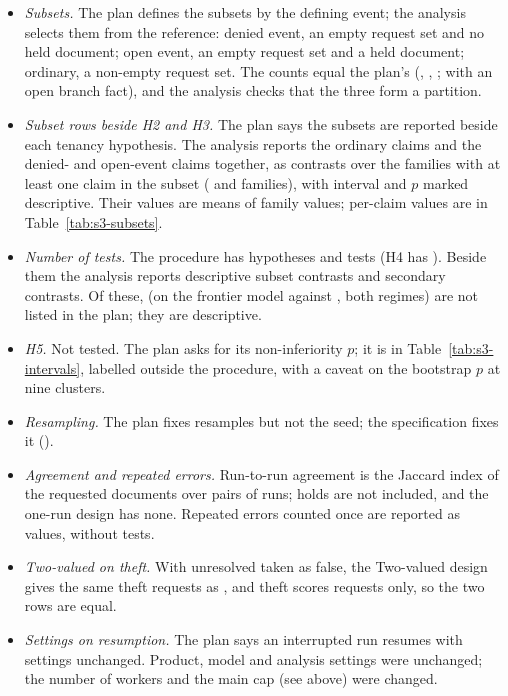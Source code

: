 \begin{itemize}[leftmargin=1.2em,itemsep=1pt]
\item \emph{Subsets.} The plan defines the subsets by the defining event; the analysis selects them from the reference: denied event, an empty request set and no held document; open event, an empty request set and a held document; ordinary, a non-empty request set. The counts equal the plan's (\sthreeClaimsDenied, \sthreeClaimsOpenEvent, \sthreeClaimsOrdinary; \sthreeClaimsOpenBranch{} with an open branch fact), and the analysis checks that the three form a partition.
\item \emph{Subset rows beside H2 and H3.} The plan says the subsets are reported beside each tenancy hypothesis. The analysis reports the ordinary claims and the denied- and open-event claims together, as contrasts over the families with at least one claim in the subset (\sthreeHTwoOrdinaryClusters{} and \sthreeHTwoDeniedOpenClusters{} families), with interval and $p$ marked descriptive. Their values are means of family values; per-claim values are in Table~\ref{tab:s3-subsets}.
\item \emph{Number of tests.} The procedure has \sthreeHypotheses{} hypotheses and \sthreePrimaryTests{} tests (H4 has \sthreeHFourTests). Beside them the analysis reports \sthreeBesideContrasts{} descriptive subset contrasts and \sthreeSecondaryContrasts{} secondary contrasts. Of these, \sthreeSecondaryVsCasePath{} (\casepath on the frontier model against \casepath, both regimes) are not listed in the plan; they are descriptive.
\item \emph{H5.} Not tested. The plan asks for its non-inferiority $p$; it is in Table~\ref{tab:s3-intervals}, labelled outside the procedure, with a caveat on the bootstrap $p$ at nine clusters.
\item \emph{Resampling.} The plan fixes \sthreeBootstrap{} resamples but not the seed; the specification fixes it (\sthreeSeed).
\item \emph{Agreement and repeated errors.} Run-to-run agreement is the Jaccard index of the requested documents over pairs of runs; holds are not included, and the one-run design has none. Repeated errors counted once are reported as values, without tests.
\item \emph{Two-valued on theft.} With unresolved taken as false, the Two-valued design gives the same theft requests as \casepath, and theft scores requests only, so the two rows are equal.
\item \emph{Settings on resumption.} The plan says an interrupted run resumes with settings unchanged. Product, model and analysis settings were unchanged; the number of workers and the main cap (see above) were changed.
\end{itemize}

